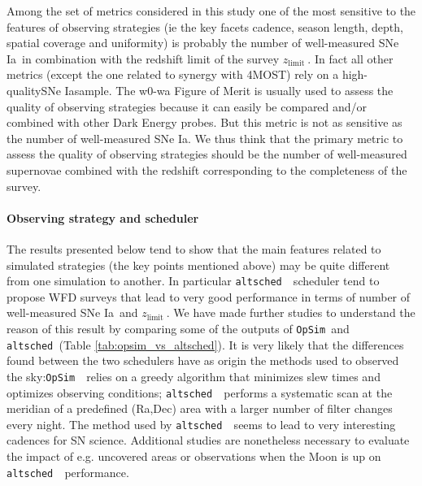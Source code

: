 \documentclass[a4paper,10pt]{article}
\newcommand{\zlimit}{$z_{\mathrm{limit}}\ $}
\newcommand{\opsim}{{\tt OpSim\ }}
\newcommand{\altsched}{{\tt altsched\ }}
\newcommand{\sne}{{SNe Ia}}
\begin{document}
Among the set of metrics considered in this study one of the most sensitive to the features of observing strategies (ie the key facets cadence, season length, depth, spatial coverage and uniformity) is probably the number of well-measured \sne~in combination with the redshift limit of the survey \zlimit. In fact all other metrics (except the one related to synergy with 4MOST) rely on a high-quality\sne sample. The w0-wa Figure of Merit is usually used to assess the quality of observing strategies because it can easily be compared and/or combined with other Dark Energy probes. But this metric is not as sensitive as the number of well-measured \sne. We thus think that the primary metric to assess the quality of observing strategies should be the number of well-measured supernovae combined with the redshift corresponding to the completeness of the survey.

\paragraph{Observing strategy and scheduler}
The results presented below tend to show that the main features related to simulated strategies (the key points mentioned above) may be quite different from one simulation to another. In particular \altsched~scheduler tend to propose WFD surveys that lead to very good performance in terms of number of well-measured \sne~and \zlimit. We have made further studies to understand the reason of this result by comparing some of the outputs of \opsim and \altsched(Table \ref{tab:opsim_vs_altsched}). It is very likely that the differences found between the two schedulers have as origin the methods used to observed the sky:\opsim~relies on a greedy algorithm that minimizes slew times and optimizes observing conditions; \altsched~performs a systematic scan at the meridian of a predefined (Ra,Dec) area with a larger number of filter changes every night. The method used by \altsched~seems to lead to very interesting cadences for SN science. Additional studies are nonetheless necessary to evaluate the impact of e.g. uncovered areas or observations when the Moon is up on \altsched~performance.
\end{document}
